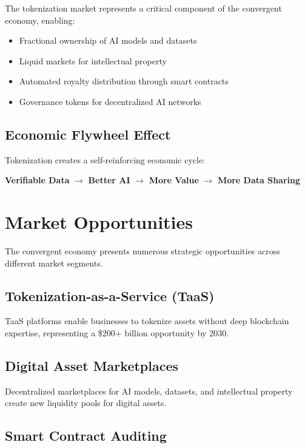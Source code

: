 \documentclass[11pt,a4paper]{report}
\begin{document}
The tokenization market represents a critical component of the convergent economy, enabling:

\begin{itemize}
\item Fractional ownership of AI models and datasets
\item Liquid markets for intellectual property
\item Automated royalty distribution through smart contracts
\item Governance tokens for decentralized AI networks
\end{itemize}

\section{Economic Flywheel Effect}

Tokenization creates a self-reinforcing economic cycle:

\textbf{Verifiable Data} $\rightarrow$ \textbf{Better AI} $\rightarrow$ \textbf{More Value} $\rightarrow$ \textbf{More Data Sharing}

\chapter{Market Opportunities}

The convergent economy presents numerous strategic opportunities across different market segments.

\section{Tokenization-as-a-Service (TaaS)}

TaaS platforms enable businesses to tokenize assets without deep blockchain expertise, representing a \$200+ billion opportunity by 2030.

\section{Digital Asset Marketplaces}

Decentralized marketplaces for AI models, datasets, and intellectual property create new liquidity pools for digital assets.

\section{Smart Contract Auditing}
\end{document}
